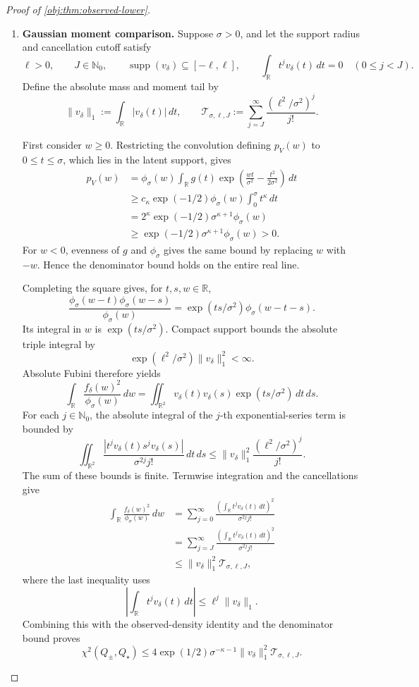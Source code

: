 \documentclass[11pt]{article}
\begin{document}
\begin{proof}[Proof of \cref{obj:thm:observed-lower}]
\begin{enumerate}
\item \textbf{Gaussian moment comparison.}
Suppose \(\sigma>0\), and let the support radius and cancellation cutoff satisfy
\[
\ell>0,\qquad J\in\mathbb N_0,\qquad
\operatorname{supp}(v_\delta)\subseteq[-\ell,\ell],\qquad
\int_{\mathbb R}t^jv_\delta(t)\,dt=0\quad(0\le j<J).
\]
Define the absolute mass and moment tail by
\[
\|v_\delta\|_1:=\int_{\mathbb R}|v_\delta(t)|\,dt,\qquad
\mathcal T_{\sigma,\ell,J}:=
\sum_{j=J}^{\infty}\frac{(\ell^2/\sigma^2)^j}{j!}.
\]

First consider \(w\ge0\). Restricting the convolution defining \(p_V(w)\) to \(0\le t\le\sigma\), which lies in the latent support, gives
\[
\begin{aligned}
p_V(w)
&=\phi_\sigma(w)\int_{\mathbb R}
g(t)\exp\left(\frac{wt}{\sigma^2}-\frac{t^2}{2\sigma^2}\right)\,dt\\
&\ge
c_\kappa\exp(-1/2)\phi_\sigma(w)\int_0^\sigma t^\kappa\,dt\\
&=
2^\kappa\exp(-1/2)\sigma^{\kappa+1}\phi_\sigma(w)\\
&\ge\exp(-1/2)\sigma^{\kappa+1}\phi_\sigma(w)>0.
\end{aligned}
\]
For \(w<0\), evenness of \(g\) and \(\phi_\sigma\) gives the same bound by replacing \(w\) with \(-w\). Hence the denominator bound holds on the entire real line.

Completing the square gives, for \(t,s,w\in\mathbb R\),
\[
\frac{\phi_\sigma(w-t)\phi_\sigma(w-s)}{\phi_\sigma(w)}
=
\exp(ts/\sigma^2)\phi_\sigma(w-t-s).
\]
Its integral in \(w\) is \(\exp(ts/\sigma^2)\). Compact support bounds the absolute triple integral by
\[
\exp(\ell^2/\sigma^2)\|v_\delta\|_1^2<\infty.
\]
Absolute Fubini therefore yields
\[
\int_{\mathbb R}\frac{f_\delta(w)^2}{\phi_\sigma(w)}\,dw
=
\iint_{\mathbb R^2}
v_\delta(t)v_\delta(s)\exp(ts/\sigma^2)\,dt\,ds.
\]
For each \(j\in\mathbb N_0\), the absolute integral of the \(j\)-th exponential-series term is bounded by
\[
\iint_{\mathbb R^2}
\frac{|t^jv_\delta(t)s^jv_\delta(s)|}{\sigma^{2j}j!}\,dt\,ds
\le
\|v_\delta\|_1^2\frac{(\ell^2/\sigma^2)^j}{j!}.
\]
The sum of these bounds is finite. Termwise integration and the cancellations give
\[
\begin{aligned}
\int_{\mathbb R}\frac{f_\delta(w)^2}{\phi_\sigma(w)}\,dw
&=
\sum_{j=0}^{\infty}
\frac{\left(\int_{\mathbb R}t^jv_\delta(t)\,dt\right)^2}
{\sigma^{2j}j!}\\
&=
\sum_{j=J}^{\infty}
\frac{\left(\int_{\mathbb R}t^jv_\delta(t)\,dt\right)^2}
{\sigma^{2j}j!}\\
&\le \|v_\delta\|_1^2\mathcal T_{\sigma,\ell,J},
\end{aligned}
\]
where the last inequality uses
\[
\left|\int_{\mathbb R}t^jv_\delta(t)\,dt\right|
\le\ell^j\|v_\delta\|_1.
\]
Combining this with the observed-density identity and the denominator bound proves
\[
\chi^2(Q_\pm,Q_\star)
\le
4\exp(1/2)\sigma^{-\kappa-1}
\|v_\delta\|_1^2\mathcal T_{\sigma,\ell,J}.
\]


\end{enumerate}
\end{proof}
\end{document}
